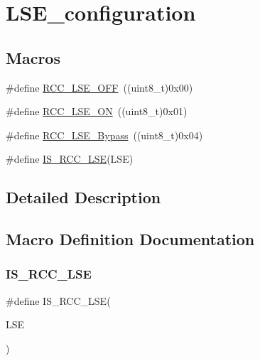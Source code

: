 \hypertarget{group___l_s_e__configuration}{}\section{L\+S\+E\+\_\+configuration}
\label{group___l_s_e__configuration}
\subsection*{Macros}
\begin{DoxyCompactItemize}
\item 
\#define \mbox{\hyperlink{group___l_s_e__configuration_ga6645c27708d0cad1a4ab61d2abb24c77}{R\+C\+C\+\_\+\+L\+S\+E\+\_\+\+O\+FF}}~((uint8\+\_\+t)0x00)
\item 
\#define \mbox{\hyperlink{group___l_s_e__configuration_gac981ea636c2f215e4473901e0912f55a}{R\+C\+C\+\_\+\+L\+S\+E\+\_\+\+ON}}~((uint8\+\_\+t)0x01)
\item 
\#define \mbox{\hyperlink{group___l_s_e__configuration_gac911af00bffa1bd1b1676f582a8a88e1}{R\+C\+C\+\_\+\+L\+S\+E\+\_\+\+Bypass}}~((uint8\+\_\+t)0x04)
\item 
\#define \mbox{\hyperlink{group___l_s_e__configuration_ga95d2678bf8f46e932e7cba75619a4d2c}{I\+S\+\_\+\+R\+C\+C\+\_\+\+L\+SE}}(L\+SE)
\end{DoxyCompactItemize}


\subsection{Detailed Description}


\subsection{Macro Definition Documentation}
\mbox{\label{group___l_s_e__configuration_ga95d2678bf8f46e932e7cba75619a4d2c}} 
\subsubsection{\texorpdfstring{IS\_RCC\_LSE}{IS\_RCC\_LSE}}
{\footnotesize\ttfamily \#define I\+S\+\_\+\+R\+C\+C\+\_\+\+L\+SE(\begin{DoxyParamCaption}\item[{}]{L\+SE }\end{DoxyParamCaption})}

